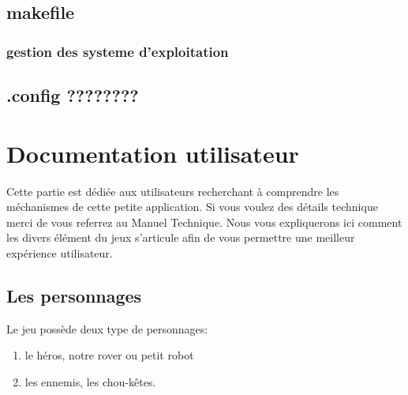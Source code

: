 \documentclass[a4paper 12pts]{article}
\begin{document}
\subsection{makefile}



\subsubsection{gestion des systeme d'exploitation}

\subsection{.config ????????}


\newpage

\section{Documentation utilisateur}



Cette partie est dédiée aux utilisateurs recherchant à comprendre les méchanismes de cette petite application.
Si vous voulez des détails technique merci de vous referrez au Manuel Technique.
Nous vous expliquerons ici comment les divers élément du jeux s'articule afin de vous permettre une meilleur expérience utilisateur.


\subsection{Les personnages}
Le jeu possède deux type de personnages: 

\begin{enumerate}
\item le héros, notre rover ou petit robot
\item les ennemis, les chou-kêtes.
\end{enumerate}
\end{document}
